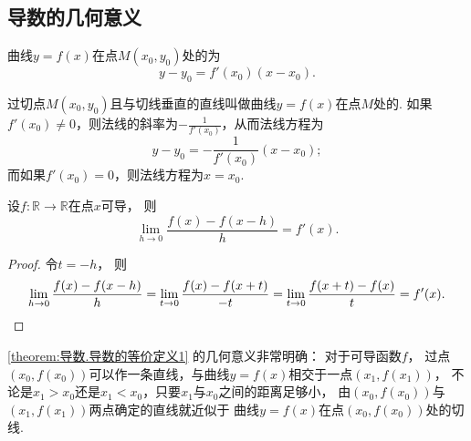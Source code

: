 \subsection{导数的几何意义}
曲线\(y=f(x)\)在点\(M(x_0,y_0)\)处的为\[
	y-y_0=f'(x_0)(x-x_0).
\]

过切点\(M(x_0,y_0)\)且与切线垂直的直线叫做曲线\(y=f(x)\)在点\(M\)处的.
如果\(f'(x_0) \neq 0\)，则法线的斜率为\(-\frac{1}{f'(x_0)}\)，从而法线方程为\[
	y-y_0=-\frac{1}{f'(x_0)}(x-x_0);
\]
而如果\(f'(x_0) = 0\)，则法线方程为\(x = x_0\).

\begin{proposition}\label{theorem:导数.导数的等价定义1}
设\(f\colon\mathbb{R}\to\mathbb{R}\)在点\(x\)可导，
则\[
	\lim_{h\to0} \frac{f(x)-f(x-h)}{h}
	= f'(x).
\]
\begin{proof}
令\(t=-h\)，
则\[
	\lim_{h\to0} \frac{f(x)-f(x-h)}{h}
	= \lim_{t\to0} \frac{f(x)-f(x+t)}{-t}
	= \lim_{t\to0} \frac{f(x+t)-f(x)}{t}
	= f'(x).
	\qedhere
\]
\end{proof}
\end{proposition}
\cref{theorem:导数.导数的等价定义1} 的几何意义非常明确：
对于可导函数\(f\)，
过点\((x_0,f(x_0))\)可以作一条直线，与曲线\(y=f(x)\)相交于一点\((x_1,f(x_1))\)，
不论是\(x_1>x_0\)还是\(x_1<x_0\)，只要\(x_1\)与\(x_0\)之间的距离足够小，
由\((x_0,f(x_0))\)与\((x_1,f(x_1))\)两点确定的直线就近似于
曲线\(y=f(x)\)在点\((x_0,f(x_0))\)处的切线.

